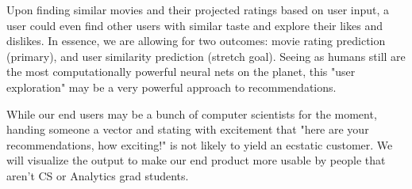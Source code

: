 Upon finding similar movies and their projected ratings based on user input, a user could even find other users with similar taste and explore their likes and dislikes. In essence, we are allowing for two outcomes: movie rating prediction (primary), and user similarity prediction (stretch goal). Seeing as humans still are the most computationally powerful neural nets on the planet, this "user exploration" may be a very powerful approach to recommendations.

While our end users may be a bunch of computer scientists for the moment, handing someone a vector and stating with excitement that "here are your recommendations, how exciting!" is not likely to yield an ecstatic customer. We will visualize the output to make our end product more usable by people that aren't CS or Analytics grad students.
